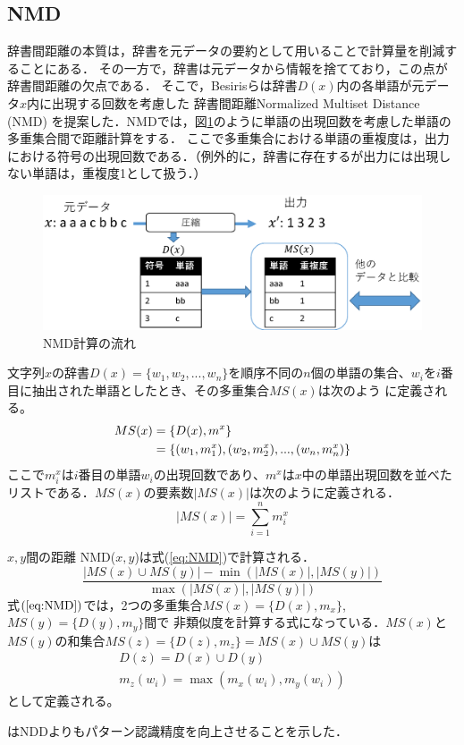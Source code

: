 \subsection{NMD} %
\label{sec:nmd}
辞書間距離の本質は，辞書を元データの要約として用いることで計算量を削減することにある．
その一方で，辞書は元データから情報を捨てており，この点が辞書間距離の欠点である．
そこで，Besirisらは辞書$D(x)$内の各単語が元データ$x$内に出現する回数を考慮した
辞書間距離Normalized Multiset Distance (NMD) \cite{NMD}を提案した．NMDでは，図\ref{fig:image/CalcNMD.eps}のように単語の出現回数を考慮した単語の多重集合間で距離計算をする．
ここで多重集合における単語の重複度は，出力における符号の出現回数である．（例外的に，辞書に存在するが出力には出現しない単語は，重複度1として扱う．）
\begin{figure}[tb]
\begin{center}
\includegraphics[clip, width=\columnwidth]{image/CalcNMD.eps}
\caption{NMD計算の流れ}
\label{fig:image/CalcNMD.eps}
\end{center}
\end{figure}

文字列$x$の辞書$D(x) = \{w_1,w_2,...,w_n\}$を順序不同の$n$個の単語の集合、$w_i$を$i$番目に抽出された単語としたとき、その多重集合$MS(x)$は次のよう
に定義される。
\begin{align}
MS(x)
&= \{D(x),m^x\} \notag \\
&= \{(w_1,m_1^x),(w_2,m_2^x),...,(w_n,m_n^x)\}
\end{align}
ここで$m_i^x$は$i$番目の単語$w_i$の出現回数であり、$m^x$は$x$中の単語出現回数を並べたリストである．$MS(x)$の要素数$|MS(x)|$は次のように定義される．
\begin{equation}
|MS(x)| = \sum_{i=1}^n m_i^x
\end{equation}

$x,y$間の距離 NMD($x,y$)は式(\ref{eq:NMD})で計算される．
\begin{equation}
\frac{|MS(x)\cup MS(y)| - \min(|MS(x)|,|MS(y)|)}{\max(|MS(x)|,|MS(y)|)}
\label{eq:NMD}
\end{equation}
式$(\ref{eq:NMD})$では，2つの多重集合$MS(x) = \{D(x),m_x\}$, $MS(y) = \{D(y),m_y\} $間で
非類似度を計算する式になっている．$MS(x)$と$MS(y)$の和集合$MS(z)= \{D(z),m_z\}=
MS(x)\cup MS(y)$は
\begin{gather}
\label{eq:x_cup_y_0}
D(z) = D(x)\cup D(y) \\\label{eq:x_cup_y_1}
m_z(w_i) = \max(m_x(w_i),m_y(w_i))
\end{gather}
として定義される。



\cite{NMD}はNDDよりもパターン認識精度を向上させることを示した．
